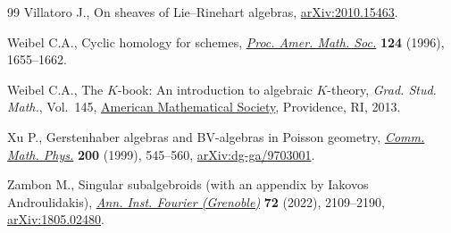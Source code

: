 \documentclass[pdftex]{sigma}
\numberwithin{equation}{section}
\theoremstyle{definition}
\begin{document}
\begin{thebibliography}{99}
Villatoro J., On sheaves of {L}ie--{R}inehart algebras,
 \href{http://arxiv.org/abs/2010.15463}{arXiv:2010.15463}.

Weibel C.A., Cyclic homology for schemes,
 \href{https://doi.org/10.1090/S0002-9939-96-02913-9}{\textit{Proc. Amer.
 Math. Soc.}} \textbf{124} (1996), 1655--1662.

Weibel C.A., The {$K$}-book: {A}n introduction to algebraic $K$-theory,
 \textit{Grad. Stud. Math.}, Vol.~145,
 \href{https://doi.org/10.1090/gsm/145}{American Mathematical Society},
 Providence, RI, 2013.

Xu P., Gerstenhaber algebras and {BV}-algebras in {P}oisson geometry,
 \href{https://doi.org/10.1007/s002200050540}{\textit{Comm. Math. Phys.}}
 \textbf{200} (1999), 545--560,
 \href{http://arxiv.org/abs/dg-ga/9703001}{arXiv:dg-ga/9703001}.

Zambon M., Singular subalgebroids (with an appendix by {I}akovos
 {A}ndroulidakis), \href{https://doi.org/10.5802/aif.3493}{\textit{Ann. Inst.
 Fourier (Grenoble)}} \textbf{72} (2022), 2109--2190,
 \href{http://arxiv.org/abs/1805.02480}{arXiv:1805.02480}.

\end{thebibliography}\LastPageEnding
\end{document}
